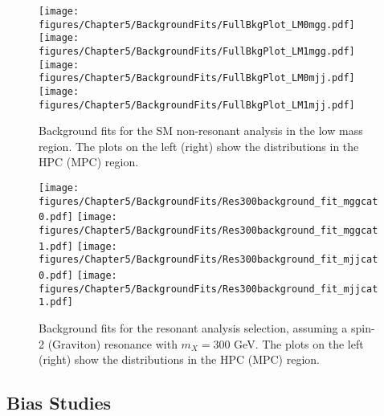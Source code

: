 \begin{figure*}[!htbp]
  \centering
  \texttt{[image: figures/Chapter5/BackgroundFits/FullBkgPlot\_LM0mgg.pdf]}\hfil
  \texttt{[image: figures/Chapter5/BackgroundFits/FullBkgPlot\_LM1mgg.pdf]}\hfil
  \texttt{[image: figures/Chapter5/BackgroundFits/FullBkgPlot\_LM0mjj.pdf]}\hfil
  \texttt{[image: figures/Chapter5/BackgroundFits/FullBkgPlot\_LM1mjj.pdf]}\hfil
  \caption{Background fits for the SM \HH non-resonant analysis in the low mass region. The plots on the left (right) show the distributions in the HPC (MPC) region.}
  \label{fig:bkg_fit_nonres_1}
\end{figure*}

\begin{figure*}[!htbp]
  \centering
  \texttt{[image: figures/Chapter5/BackgroundFits/Res300background\_fit\_mggcat0.pdf]}\hfil
  \texttt{[image: figures/Chapter5/BackgroundFits/Res300background\_fit\_mggcat1.pdf]}\hfil
  \texttt{[image: figures/Chapter5/BackgroundFits/Res300background\_fit\_mjjcat0.pdf]}\hfil
  \texttt{[image: figures/Chapter5/BackgroundFits/Res300background\_fit\_mjjcat1.pdf]}\hfil

  \caption{Background fits for the resonant analysis selection, assuming a spin-2 (Graviton) resonance with $m_{X} = 300$ GeV. The plots on the left (right) show the distributions in the HPC (MPC) region.}
  \label{fig:bkg_fit_res_320}
\end{figure*}

\subsection{Bias Studies} \label{sec:biasstudy}

